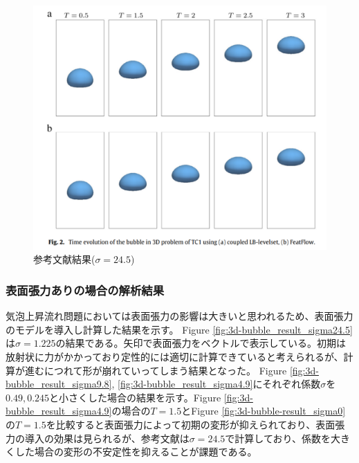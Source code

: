 \documentclass[8pt,a4paper]{article}
\begin{document}
\begin{figure}[H]
	\centering
	\includegraphics[width=10truecm]{pics/3d-bubble/result-ref.pdf}
	\caption{参考文献結果($\sigma=24.5$)\cite{Safi2017}}
	\label{fig:3d-bubble-result-ref}
\end{figure}

\subsubsection{表面張力ありの場合の解析結果}
気泡上昇流れ問題においては表面張力の影響は大きいと思われるため、表面張力のモデルを導入し計算した結果を示す。
Figure \ref{fig:3d-bubble_result_sigma24.5}は$\sigma=1.225$の結果である。矢印で表面張力をベクトルで表示している。初期は放射状に力がかかっており定性的には適切に計算できていると考えられるが、計算が進むにつれて形が崩れていってしまう結果となった。
Figure \ref{fig:3d-bubble_result_sigma9.8}, \ref{fig:3d-bubble_result_sigma4.9}にそれぞれ係数$\sigma$を$0.49, 0.245$と小さくした場合の結果を示す。Figure \ref{fig:3d-bubble_result_sigma4.9}の場合の$T=1.5$とFigure \ref{fig:3d-bubble-result_sigma0}の$T=1.5$を比較すると表面張力によって初期の変形が抑えられており、表面張力の導入の効果は見られるが、参考文献は$\sigma=24.5$で計算しており、係数を大きくした場合の変形の不安定性を抑えることが課題である。
\end{document}
